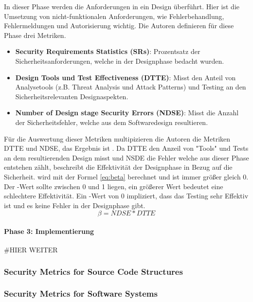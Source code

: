 \documentclass[12pt, a4paper, ngerman]{article}
\begin{document}
In dieser Phase werden die Anforderungen in ein Design überführt. 
Hier ist die Umsetzung von nicht-funktionalen Anforderungen, wie Fehlerbehandlung, Fehlermeldungen und Autorisierung wichtig.
Die Autoren definieren für diese Phase drei Metriken.
\begin{itemize}
  \item \textbf{Security Requirements Statistics (SRs)}: Prozentsatz der Sicherheitsanforderungen, welche in der Designphase bedacht wurden.
  \item \textbf{Design Tools und Test Effectiveness (DTTE)}: Misst den Anteil von Analysetools (z.B. Threat Analysis und Attack Patterns) und Testing an den Sicherheitsrelevanten Designaspekten. 
  \item \textbf{Number of Design stage Security Errors (NDSE)}: Misst die Anzahl der Sicherheitsfehler, welche aus dem Softwaredesign resultieren. 
\end{itemize}
Für die Auswertung dieser Metriken multipizieren die Autoren die Metriken DTTE und NDSE, das Ergebnis ist \beta. 
Da DTTE den Anzeil von "Tools" und Tests an dem resultierenden Design misst und NSDE die Fehler welche aus dieser Phase entstehen zählt, 
beschreibt \beta die Effektivität der Designphase in Bezug auf die Sicherheit.
\beta wird mit der Formel \ref{eq:beta} berechnet und ist immer größer gleich 0. 
Der \beta-Wert sollte zwischen 0 und 1 liegen, ein größerer Wert bedeutet eine schlechtere Effektivität.
Ein \beta-Wert von 0 impliziert, dass das Testing sehr Effektiv ist und es keine Fehler in der Designphase gibt.
\begin{equation} \label{eq:beta}
  \beta = NDSE * DTTE
\end{equation}

\paragraph{Phase 3: Implementierung}

#HIER WEITER

\subsubsection{Security Metrics for Source Code Structures~\cite{Chowdhury_Chan_Zulkernine_2008}}

\subsubsection{Security Metrics for Software Systems~\cite{Wang_Wang_Guo_Xia_2009}}
\end{document}
